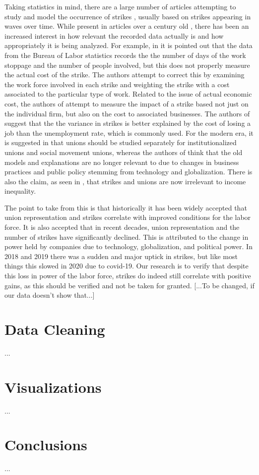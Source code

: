 \documentclass[reqno,11pt]{amsart}
\begin{document}
Taking statistics in mind, there are a large number of articles attempting
to study and model the occurrence of strikes \cite{Kennan, Kennan2, Mauro, Naples}, 
usually based on strikes appearing in waves over time. While present 
in articles over a century old \cite{Cross},
there has been an increased interest in
how relevant the recorded data actually is and how appropriately it is being
analyzed. For example,
in \cite{PalombaPalomba} it is pointed out that the data
from the Bureau of Labor statistics records the
the number of days of the work stoppage and the number of people involved,
but this does not properly measure the actual cost of the strike. The authors
attempt to correct this by examining the work force involved in each strike
and weighting the strike with a cost associated to the particular type of work.
Related to the issue of actual economic cost, the authors of \cite{Mchugh}
attempt to measure the impact of a strike based not just on the individual firm, 
but also on the cost to associated businesses.
The authors of \cite{SchorBowles} suggest that the the variance in strikes is better explained 
by the cost of losing a job than the unemployment rate, which is commonly used.
For the modern era, it is suggested in \cite{MartinDixon} that unions should be
studied separately for institutionalized unions and social movement unions,
whereas the authors of \cite{KeeranTarpinian} think that the old models
and explanations are no longer relevant to due to changes in business practices and public policy
stemming from technology and globalization. There is also the claim,
as seen in \cite{WallaceLeichtRaffalovich}, that strikes and unions are now irrelevant
to income inequality.


The point to take from this is that historically it has been widely accepted that
union representation and strikes correlate with improved conditions for the labor force. It is
also accepted that in recent decades, union representation and the number of strikes 
have significantly declined. This is attributed to the change in power held
by companies due to technology, globalization, and political power. In 2018 and 
2019 there was a sudden and major uptick in strikes, but like most things this
slowed in 2020 due to covid-19. Our research
is to verify that despite this loss in power of the labor force, strikes do indeed
still correlate with positive gains, as this should be verified and not be taken for granted.
[...To be changed, if our data doesn't show that...]



\section{Data Cleaning}
...

\section{Visualizations}
...

\section{Conclusions}
...







\end{document}
